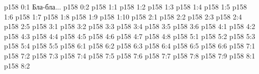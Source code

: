 \author{Промежуточные создания}
\vs p158 0:1  Бла-бла...
\vs p158 0:2 
\vs p158 1:1 
\vs p158 1:2 
\vs p158 1:3 
\vs p158 1:4 
\vs p158 1:5 
\vs p158 1:6 
\vs p158 1:7 
\vs p158 1:8 
\vs p158 1:9 
\vs p158 1:10 
\vs p158 2:1 
\vs p158 2:2 
\vs p158 2:3 
\vs p158 2:4 
\vs p158 2:5 
\vs p158 3:1 
\vs p158 3:2 
\vs p158 3:3 
\vs p158 3:4 \pc 
\vs p158 3:5 
\vs p158 3:6 
\vs p158 4:1 
\vs p158 4:2 
\vs p158 4:3 
\vs p158 4:4 
\vs p158 4:5 
\vs p158 4:6 
\vs p158 4:7 
\vs p158 4:8 
\vs p158 5:1 
\vs p158 5:2 
\vs p158 5:3 
\vs p158 5:4 
\vs p158 5:5 
\vs p158 6:1 
\vs p158 6:2 
\vs p158 6:3 
\vs p158 6:4 
\vs p158 6:5 
\vs p158 6:6 
\vs p158 7:1 
\vs p158 7:2 
\vs p158 7:3 
\vs p158 7:4 
\vs p158 7:5 
\vs p158 7:6 
\vs p158 7:7 
\vs p158 7:8 
\vs p158 7:9 
\vs p158 8:1 
\vs p158 8:2 
\quizlink
